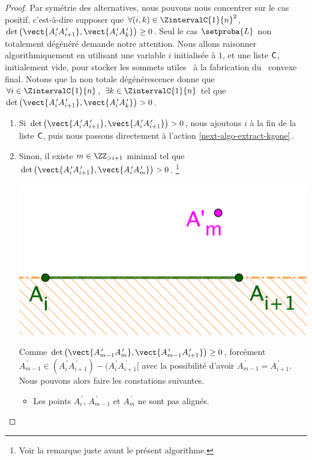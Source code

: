 \begin{proof}
    Par symétrie des alternatives, nous pouvons nous concentrer sur le cas positif, c'est-à-dire supposer que
    $\forall (i, k) \in \ZintervalC{1}{n}^2$,
	$\det \big( \vect{A^{\,\prime}_i A^{\,\prime}_{i+1}}, \vect{A^{\,\prime}_i A^{\,\prime}_k} \big) \geq 0$.
	Seul le cas $\setproba{L}$ non totalement dégénéré demande notre attention.
	Nous allons raisonner algorithmiquement en utilisant
	une variable $i$ initialisée à $1$, 
	et une liste $\mathsf{C}$, initialement vide, pour stocker les sommets \og utiles \fg\ à la fabrication du \kgone\ convexe final.
	Notons que la non totale dégénérescence donne que 
    $\forall i \in \ZintervalC{1}{n}$,
    $\exists k \in \ZintervalC{1}{n}$
    tel que
	$\det \big( \vect{A^{\,\prime}_i A^{\,\prime}_{i+1}}, \vect{A^{\,\prime}_i A^{\,\prime}_k} \big) > 0$.
	\begin{enumerate}[label=\fbox{\small\bfseries\textsf{A\kern.25pt\arabic*}}]
    	\item \label{start-algo-extract-kgone}
	    Si 
		$\det \big( \vect{A^{\,\prime}_i A^{\,\prime}_{i+1}}, \vect{A^{\,\prime}_i A^{\,\prime}_{i+1}} \big) > 0$,
		nous ajoutons $i$ à la fin de la liste $\mathsf{C}$,
		puis nous passons directement à l'action \ref{next-algo-extract-kgone}\,.


    	\item Sinon, il existe 
	    $m \in \ZZ_{>i+1}$ minimal tel que
		$\det \big( \vect{A^{\,\prime}_i A^{\,\prime}_{i+1}}, \vect{A^{\,\prime}_i A^{\,\prime}_m} \big) > 0$.%
		\footnote{
		    Voir la remarque juste avant le présent algorithme.
		}
        \begin{center}
        	\includegraphics[scale=.4]{content/polygon/at-least-one/next-extract-kgone.png}
        \end{center}
        
        \noindent
        Comme 
        $\det \big( \vect{A^{\,\prime}_{m-1} A^{\,\prime}_m}, \vect{A^{\,\prime}_{m-1} A^{\,\prime}_{i+1}} \big) \geq 0$, 
        forcément 
        $A^{\,\prime}_{m-1} \in (A^{\,\prime}_i A^{\,\prime}_{i+1}) - (A^{\,\prime}_i A^{\,\prime}_{i+1}[$ 
        avec la possibilité d'avoir $A^{\,\prime}_{m-1} = A^{\,\prime}_{i+1}$.
        Nous pouvons alors faire les constations suivantes.
        \begin{itemize}
            \item Les points $A^{\,\prime}_i$, $A^{\,\prime}_{m-1}$ et $A^{\,\prime}_m$ ne sont pas alignés.


\end{itemize}
\end{enumerate}
\end{proof}
